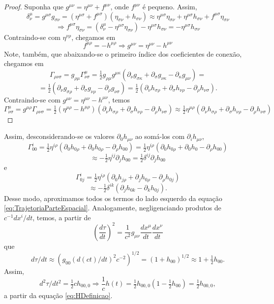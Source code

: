 \begin{proof}
	Suponha que $ g^{\mu \nu}=\eta^{\mu \nu}+f^{\mu \nu} $, onde $ f^{\mu\nu} $ é pequeno. Assim,
	 \[\delta_{\nu}^{\mu}=g^{\mu \sigma} g_{\sigma \nu}=\left(\eta^{\mu \sigma}+f^{\mu \sigma}\right)\left(\eta_{\sigma \nu}+h_{\sigma \nu}\right) \approx
	 \eta^{\mu\sigma}\eta_{\sigma\nu}+\eta^{\mu\sigma}h_{\sigma\nu}+f^{\mu\sigma}\eta_{\sigma \nu} \]
	 \[
	 \Rightarrow f^{\mu\sigma}\eta_{\sigma \nu}= (\delta_{\nu}^{\mu} - \eta^{\mu\sigma}\eta_{\sigma\nu})-\eta^{\mu\sigma}h_{\sigma\nu} = -\eta^{\mu\sigma}h_{\sigma\nu}
	 \]
	 Contraindo-se com $ \eta^{\nu \rho} $, chegamos em 
	 \[f^{\mu\rho}=-h^{\mu\rho} \Rightarrow g^{\mu \nu}=\eta^{\mu \nu}-h^{\mu \nu} \]
	 Note, também, que abaixando-se o primeiro índice dos coeficientes de conexão, chegamos em 
	 \[ \Gamma_{\rho \nu \sigma}=g_{\rho\mu}\Gamma_{\nu \sigma}^\mu=
	 \tfrac{1}{2}g_{\rho\mu}g^{\mu\kappa}(\partial_{\nu}g_{\sigma\kappa}+\partial_{\sigma}g_{\nu\kappa}-\partial_{\kappa}g_{\mu\nu})=
	 \]
	 \[
	 =\tfrac{1}{2}\left(\partial_{\nu} g_{\sigma \rho}+\partial_{\sigma} g_{\nu \rho}-\partial_{\rho} g_{\nu \sigma}\right)=
	 \tfrac{1}{2}\left(\partial_{\nu} h_{\sigma \rho}+\partial_{\sigma} h_{\nu \rho}-\partial_{\rho} h_{\nu \sigma}\right).
	\]
	  Contraindo-se com $  g^{\mu \nu}=\eta^{\mu \nu}-h^{\mu \nu} $, temos 
	 \[
	 \Gamma^{\mu}_{\nu\sigma}=
	 g^{\mu\rho}\Gamma_{\rho\nu\sigma}= \tfrac{1}{2}(\eta^{\mu\rho}-h^{\mu\rho})(\partial_{\nu} h_{\sigma \rho}+\partial_{\sigma} h_{\nu \rho}-\partial_{\rho} h_{\nu \sigma})
	 \approx \tfrac{1}{2} \eta^{\mu \rho}\left(\partial_{\nu} h_{\sigma \rho}+\partial_{\sigma} h_{\nu \rho}-\partial_{\rho} h_{\nu \sigma}\right)
	 \]	 
\end{proof}

Assim, desconsiderando-se os valores $ \partial_{0} h_{\mu \nu} $ ao somá-los com $ \partial_{i} h_{\mu \nu} $,
\[
\Gamma_{00}^{i}=\tfrac{1}{2} \eta^{i \rho}\left(\partial_{0} h_{0 \rho}+\partial_{0} h_{0 \rho}-\partial_{\rho} h_{00}\right) = 
\tfrac{1}{2} \eta^{i \rho}\left(\partial_{0} h_{0 \rho}+\partial_{0} h_{0 }-\partial_{\rho} h_{00}\right)
\]
\[
\approx -\tfrac{1}{2} \eta^{i j} \partial_{j} h_{00}=\tfrac{1}{2} \delta^{i j} \partial_{j} h_{00}
\]
e
\[
\Gamma_{0 j}^{i}=\tfrac{1}{2} \eta^{i \rho}\left(\partial_{0} h_{j \rho}+\partial_{j} h_{0 \rho}-\partial_{\rho} h_{0 j}\right)
\]
\[
\approx -\tfrac{1}{2} \delta^{i k}\left(\partial_{j} h_{0 k}-\partial_{k} h_{0 j}\right) .
\]
Desse modo, aproximamos todos os termos do lado esquerdo da equação \eqref{eq:TrajetoriaParteEspacial}. Analogamente, negligenciando produtos de $ c^{-1} d x^{i} / d t $, temos, a partir de
\[
\left(\frac{d \tau}{d t}\right)^{2}=\frac{1}{c^{2}} g_{\mu \nu} \frac{d x^{\mu}}{d t} \frac{d x^{\nu}}{d t}
\]
que
\[
d \tau / d t\approx \left(g_{00}\left({d(ct)}/dt\right)^2c^{-2}\right)^{1/2} = \left(1+h_{00}\right)^{1 / 2}\approx 1+\tfrac{1}{2} h_{00} .
\]
Assim,
\[
d^{2} \tau / d t^{2}=\tfrac{1}{2} c h_{00,0} \Rightarrow \frac{1}{c} h(t)=\tfrac{1}{2} h_{00,0}\left(1-\tfrac{1}{2} h_{00}\right)=\tfrac{1}{2} h_{00,0},
\]
a partir da equação \eqref{eq:HDefinicao}. 

